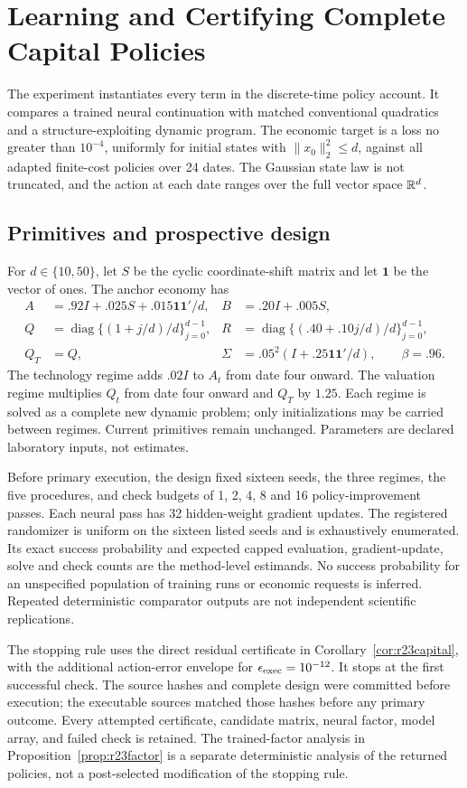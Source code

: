 \section{Learning and Certifying Complete Capital Policies}\label{sec:r23experiment}
The experiment instantiates every term in the discrete-time policy account.
It compares a trained neural continuation with matched conventional
quadratics and a structure-exploiting dynamic program. The economic target
is a loss no greater than $10^{-4}$, uniformly for initial states with
$\|x_0\|_2^2\leq d$, against all adapted finite-cost policies over 24 dates.
The Gaussian state law is not truncated, and the action at each date ranges
over the full vector space $\mathbb R^d$.

\subsection{Primitives and prospective design}
For $d\in\{10,50\}$, let $S$ be the cyclic coordinate-shift matrix and let
$\mathbf1$ be the vector of ones. The anchor economy has
\begin{align*}
 A&=.92I+.025S+.015\mathbf1\mathbf1'/d,&B&=.20I+.005S,\\
 Q&=\operatorname{diag}\{(1+j/d)/d\}_{j=0}^{d-1},&
 R&=\operatorname{diag}\{(.40+.10j/d)/d\}_{j=0}^{d-1},\\
 Q_T&=Q,&\Sigma&=.05^2(I+.25\mathbf1\mathbf1'/d),\qquad\beta=.96.
\end{align*}
The technology regime adds $.02I$ to $A_t$ from date four onward.
The valuation regime multiplies $Q_t$ from date four onward and $Q_T$ by
$1.25$. Each regime is solved as a complete new dynamic problem; only
initializations may be carried between regimes. Current primitives remain
unchanged. Parameters are declared laboratory inputs, not estimates.

Before primary execution, the design fixed sixteen seeds, the three regimes,
the five procedures, and check budgets of 1, 2, 4, 8 and 16 policy-improvement
passes. Each neural pass has 32 hidden-weight gradient updates. The
registered randomizer is uniform on the sixteen listed seeds and is
exhaustively enumerated. Its exact success probability and expected capped
evaluation, gradient-update, solve and check counts are the method-level
estimands. No success probability for an unspecified population of training
runs or economic requests is inferred. Repeated deterministic comparator
outputs are not independent scientific replications.

The stopping rule uses the direct residual certificate in
Corollary~\ref{cor:r23capital}, with the additional action-error envelope
for $\epsilon_{\rm exec}=10^{-12}$. It stops at the first successful check.
The source hashes and complete design were committed before execution;
the executable sources matched those hashes before any primary outcome.
Every attempted certificate, candidate matrix, neural factor, model array,
and failed check is retained. The trained-factor analysis in
Proposition~\ref{prop:r23factor} is a separate deterministic analysis of the
returned policies, not a post-selected modification of the stopping rule.


